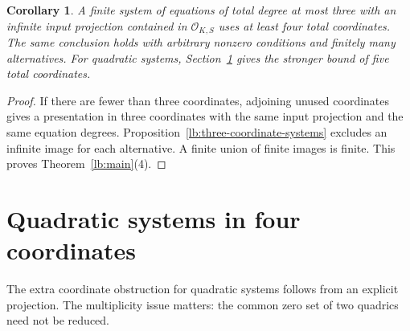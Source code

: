 \documentclass[11pt,a4paper]{article}
\newtheorem{corollary}[theorem]{Corollary}
\theoremstyle{definition}
\newcommand{\OKS}{\mathcal O_{K,S}}
\begin{document}
\begin{corollary}\label{lb:low-degree-systems}
A finite system of equations of total degree at most three
with an infinite input projection contained in $\OKS$ uses
at least four total coordinates. The same conclusion holds
with arbitrary nonzero conditions and finitely many alternatives.
For quadratic systems, Section~\ref{lb:quadratic-section} gives the stronger bound of
five total coordinates.
\end{corollary}
\begin{proof}
If there are fewer than three coordinates, adjoining unused
coordinates gives a presentation in three coordinates with
the same input projection and the same equation degrees.
Proposition~\ref{lb:three-coordinate-systems} excludes an
infinite image for each alternative. A finite union of finite
images is finite. This proves Theorem~\ref{lb:main}(4).
\end{proof}

\section{Quadratic systems in four coordinates}\label{lb:quadratic-section}

The extra coordinate obstruction for quadratic systems follows from
an explicit projection. The multiplicity issue matters: the common
zero set of two quadrics need not be reduced.
\end{document}
